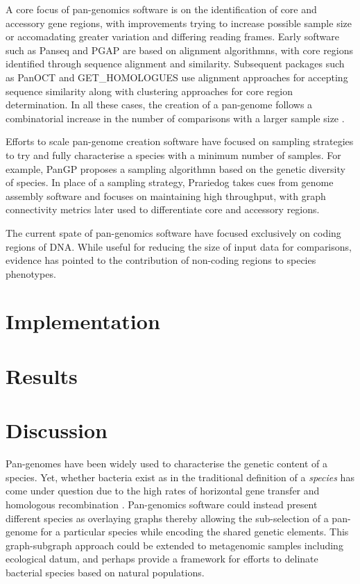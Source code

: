\documentclass{article}
\begin{document}
A core focus of pan-genomics software is on the identification of core and accessory gene regions, with improvements trying to increase possible sample size or accomadating greater variation and differing reading frames.
Early software such as Panseq \cite{laing2010pan} and PGAP \cite{zhao2011pgap} are based on alignment algorithmns, with core regions identified through sequence alignment and similarity.
Subsequent packages such as PanOCT \cite{fouts2012panoct} and GET_HOMOLOGUES \cite{contreras2013get_homologues} use alignment approaches for accepting sequence similarity along with clustering approaches for core region determination.
In all these cases, the creation of a pan-genome follows a combinatorial increase in the number of comparisons with a larger sample size \cite{vernikos2015ten}.

Efforts to scale pan-genome creation software have focused on sampling strategies to try and fully characterise a species with a minimum number of samples.
For example, PanGP \cite{zhao2014pangp} proposes a sampling algorithmn based on the genetic diversity of species.
In place of a sampling strategy, Prariedog takes cues from genome assembly software and focuses on maintaining high throughput, with graph connectivity metrics later used to differentiate core and accessory regions.


The current spate of pan-genomics software have focused exclusively on coding regions of DNA.
While useful for reducing the size of input data for comparisons, evidence \cite{} has pointed to the contribution of non-coding regions to species phenotypes.


\section{Implementation}

\section{Results}

\section{Discussion}

Pan-genomes have been widely used to characterise the genetic content of a species.
Yet, whether bacteria exist as in the traditional definition of a \textit{species} has come under question due to the high rates of horizontal gene transfer and homologous recombination \cite{fraser2009bacterial}.
Pan-genomics software could instead present different species as overlaying graphs thereby allowing the sub-selection of a pan-genome for a particular species while encoding the shared genetic elements.
This graph-subgraph approach could be extended to metagenomic samples including ecological datum, and perhaps provide a framework for efforts \cite{caro2012bacterial} to delinate bacterial species based on natural populations.
\end{document}
